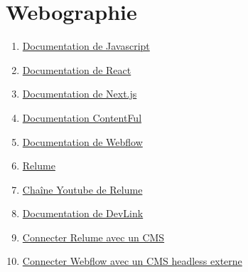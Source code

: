 \chapter*{Webographie}
\begin{enumerate}
  \item \href{https://www.youtube.com/watch?v=6Qw06niEs0I&t}{Documentation de Javascript} \label{doc:javascript}
  \item \href{https://react.dev/}{Documentation de React} \label{doc:react}
  \item \href{https://nextjs.org/docs}{Documentation de Next.js} \label{doc:nextjs}
  \item \href{https://www.contentful.com/developers/docs/}{Documentation ContentFul} \label{doc:contentful}
  \item \href{https://developers.webflow.com/}{Documentation de Webflow} \label{doc:webflow}
  \item  \href{https://www.relume.io/}{Relume} \label{doc:relume}
  \item \href{https://www.youtube.com/@Relume_io}{Chaîne Youtube de Relume} \label{doc:yb-relume} 
  \item \href{https://docs.developers.webflow.com/data/docs/devlink-documentation-and-usage-guide}{Documentation de DevLink} \label{doc:devlink}
  \item \href{https://www.youtube.com/watch?v=6Qw06niEs0I&t}{Connecter Relume avec un CMS} \label{doc:relume-cms}
  \item \href{https://www.youtube.com/watch?v=HMsrFzoZYr0}{Connecter Webflow avec un CMS headless externe} \label{doc:webflow-cms}
\end{enumerate}